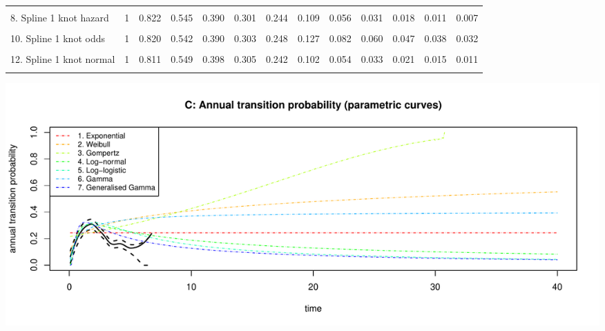 \documentclass[]{article}
\begin{document}
{\begin{tabular}{lrrrrrrrrrrrr}
\cellcolor{gray!6}{7. Generalised Gamma} & \cellcolor{gray!6}{1} & \cellcolor{gray!6}{0.810} & \cellcolor{gray!6}{0.555} & \cellcolor{gray!6}{0.399} & \cellcolor{gray!6}{0.302} & \cellcolor{gray!6}{0.237} & \cellcolor{gray!6}{0.100} & \cellcolor{gray!6}{0.057} & \cellcolor{gray!6}{0.037} & \cellcolor{gray!6}{0.026} & \cellcolor{gray!6}{0.019} & \cellcolor{gray!6}{0.015}\\
8. Spline 1 knot hazard & 1 & 0.822 & 0.545 & 0.390 & 0.301 & 0.244 & 0.109 & 0.056 & 0.031 & 0.018 & 0.011 & 0.007\\
\cellcolor{gray!6}{9. Spline 2 knots hazard} & \cellcolor{gray!6}{1} & \cellcolor{gray!6}{0.817} & \cellcolor{gray!6}{0.546} & \cellcolor{gray!6}{0.396} & \cellcolor{gray!6}{0.305} & \cellcolor{gray!6}{0.243} & \cellcolor{gray!6}{0.096} & \cellcolor{gray!6}{0.043} & \cellcolor{gray!6}{0.021} & \cellcolor{gray!6}{0.010} & \cellcolor{gray!6}{0.005} & \cellcolor{gray!6}{0.003}\\
10. Spline 1 knot odds & 1 & 0.820 & 0.542 & 0.390 & 0.303 & 0.248 & 0.127 & 0.082 & 0.060 & 0.047 & 0.038 & 0.032\\
\cellcolor{gray!6}{11. Spline 2 knots odds} & \cellcolor{gray!6}{1} & \cellcolor{gray!6}{0.817} & \cellcolor{gray!6}{0.544} & \cellcolor{gray!6}{0.393} & \cellcolor{gray!6}{0.304} & \cellcolor{gray!6}{0.246} & \cellcolor{gray!6}{0.120} & \cellcolor{gray!6}{0.075} & \cellcolor{gray!6}{0.054} & \cellcolor{gray!6}{0.041} & \cellcolor{gray!6}{0.033} & \cellcolor{gray!6}{0.027}\\
12. Spline 1 knot normal & 1 & 0.811 & 0.549 & 0.398 & 0.305 & 0.242 & 0.102 & 0.054 & 0.033 & 0.021 & 0.015 & 0.011\\
\cellcolor{gray!6}{13. Spline 2 knots normal} & \cellcolor{gray!6}{1} & \cellcolor{gray!6}{0.815} & \cellcolor{gray!6}{0.546} & \cellcolor{gray!6}{0.392} & \cellcolor{gray!6}{0.303} & \cellcolor{gray!6}{0.245} & \cellcolor{gray!6}{0.113} & \cellcolor{gray!6}{0.065} & \cellcolor{gray!6}{0.042} & \cellcolor{gray!6}{0.029} & \cellcolor{gray!6}{0.021} & \cellcolor{gray!6}{0.016}\\
\bottomrule
\end{tabular}}

\begin{flushleft}\includegraphics[height=0.29\textheight]{Images/validate_extrapolation3-3} \end{flushleft}
\end{document}
